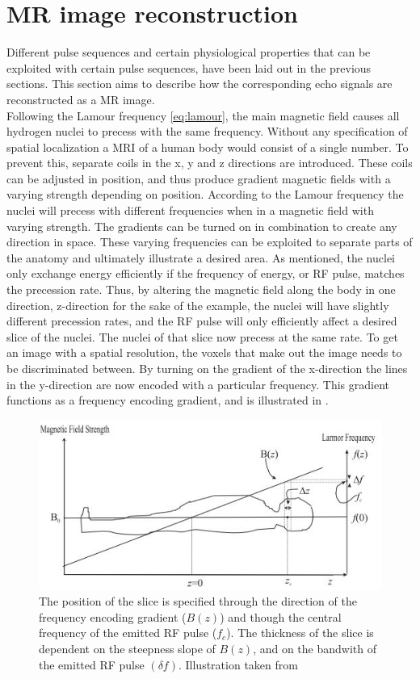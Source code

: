 \section{MR image reconstruction}\label{sec:IMrec}

Different pulse sequences and certain physiological properties that can be exploited with certain pulse sequences, have been laid out in the previous sections. This section aims to describe how the corresponding echo signals are reconstructed as a MR image.\\
Following the Lamour frequency \eqref{eq:lamour}, the main magnetic field causes all hydrogen nuclei to precess with the same frequency. Without any specification of spatial localization a MRI of a human body would consist of a single number. To prevent this, separate coils in the x, y and z directions are introduced. These coils can be adjusted in position, and thus produce gradient magnetic fields with a varying strength depending on position. According to the Lamour frequency the nuclei will precess with different frequencies when in a magnetic field with varying strength. The gradients can be turned on in combination to create any direction in space. These varying frequencies can be exploited to separate parts of the anatomy and ultimately illustrate a desired area. As mentioned, the nuclei only exchange energy efficiently if the frequency of energy, or RF pulse, matches the precession rate. Thus, by altering the magnetic field along the body in one direction, z-direction for the sake of the example, the nuclei will have slightly different precession rates, and the RF pulse will only efficiently affect a desired slice of the nuclei.
The nuclei of that slice now precess at the same rate. To get an image with a spatial resolution, the voxels that make out the image needs to be discriminated between. By turning on the gradient of the x-direction the lines in the y-direction are now encoded with a particular frequency. This gradient functions as a frequency encoding gradient, and is illustrated in . \cite{Bharath2008} \\
 \begin{figure}[H]                 
	\includegraphics[width=.7\textwidth]{figures/aBackground/gradient}  
	\caption{The position of the slice is specified through the direction of the frequency encoding gradient ($B(z)$) and though the central frequency of the emitted RF pulse ($f_c$). The thickness of the slice is dependent on the steepness slope of $B(z)$, and on the bandwith of the emitted RF pulse $(\delta f)$. Illustration taken from \cite{Bharath2008}}
	\label{fig:back:gradient} 
\end{figure} 
